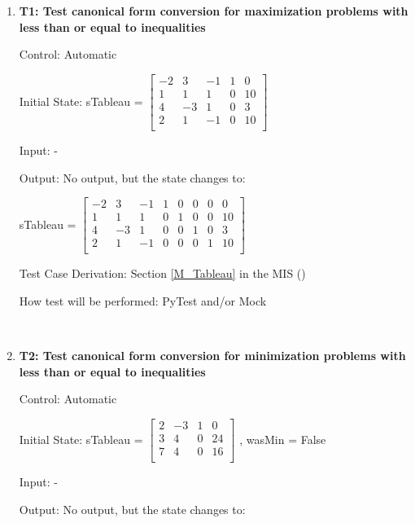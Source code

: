 \documentclass[12pt, titlepage]{article}
\begin{document}
\begin{enumerate}
		
	\item{\textbf{T1: Test canonical form conversion for maximization problems 
	with less than or equal to inequalities}}
		
	Control: Automatic 
		
	Initial State: sTableau = $\begin{bmatrix}
	-2 & 3 & -1 & 1 & 0\\
	1 & 1 & 1 & 0 & 10\\
	4 & -3 & 1 & 0 & 3\\
	2 & 1 & -1 & 0 & 10\\
	\end{bmatrix}$
		
	Input: -
		
	Output: No output, but the state changes to:
	
	sTableau = $\begin{bmatrix}
	-2 & 3 & -1 & 1 & 0 & 0 & 0 & 0\\
	1 & 1 & 1 & 0 & 1 & 0 & 0 & 10\\
	4 & -3 & 1 & 0 & 0 & 1 & 0 & 3\\
	2 & 1 & -1 & 0 & 0 & 0 & 1 & 10\\
	\end{bmatrix}$
	
	Test Case Derivation: Section \ref{M_Tableau} in the MIS (\cite{losms-mis})
		
	How test will be performed: PyTest and/or Mock
	
	 \\

	\item{\textbf{T2: Test canonical form conversion for minimization problems 
	with less than or equal to inequalities}}
	
	Control: Automatic 
	
	Initial State: sTableau = $\begin{bmatrix}
	2 & -3 & 1 & 0\\
	3 & 4 & 0 & 24\\
	7 & 4 & 0 & 16\\
	\end{bmatrix}$ , wasMin = False
	
	Input: -
	
	Output: No output, but the state changes to:
	

\end{enumerate}
\end{document}
